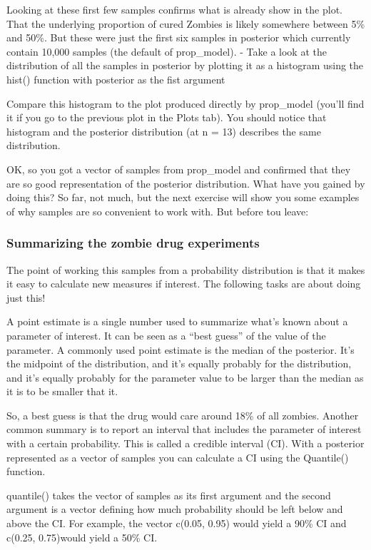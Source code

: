 \documentclass[
]{article}
\begin{document}
Looking at these first few samples confirms what is already show in the
plot. That the underlying proportion of cured Zombies is likely
somewhere between 5\% and 50\%. But these were just the first six
samples in posterior which currently contain 10,000 samples (the default
of prop\_model). - Take a look at the distribution of all the samples in
posterior by plotting it as a histogram using the hist() function with
posterior as the fist argument

Compare this histogram to the plot produced directly by prop\_model
(you'll find it if you go to the previous plot in the Plots tab). You
should notice that histogram and the posterior distribution (at n = 13)
describes the same distribution.

OK, so you got a vector of samples from prop\_model and confirmed that
they are so good representation of the posterior distribution. What have
you gained by doing this? So far, not much, but the next exercise will
show you some examples of why samples are so convenient to work with.
But before tou leave:

\hypertarget{summarizing-the-zombie-drug-experiments}{%
\subsubsection{Summarizing the zombie drug
experiments}\label{summarizing-the-zombie-drug-experiments}}

The point of working this samples from a probability distribution is
that it makes it easy to calculate new measures if interest. The
following tasks are about doing just this!

A point estimate is a single number used to summarize what's known about
a parameter of interest. It can be seen as a ``best guess'' of the value
of the parameter. A commonly used point estimate is the median of the
posterior. It's the midpoint of the distribution, and it's equally
probably for the distribution, and it's equally probably for the
parameter value to be larger than the median as it is to be smaller that
it.

So, a best guess is that the drug would care around 18\% of all zombies.
Another common summary is to report an interval that includes the
parameter of interest with a certain probability. This is called a
credible interval (CI). With a posterior represented as a vector of
samples you can calculate a CI using the Quantile() function.

quantile() takes the vector of samples as its first argument and the
second argument is a vector defining how much probability should be left
below and above the CI. For example, the vector c(0.05, 0.95) would
yield a 90\% CI and c(0.25, 0.75)would yield a 50\% CI.
\end{document}
